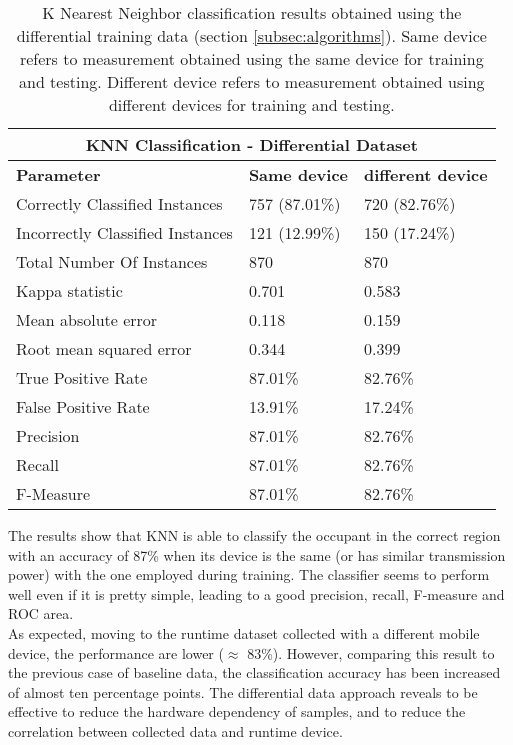 \begin{table}
\center
\caption[K Nearest Neighbor classification results obtained using the differential training data.]{K Nearest Neighbor classification results obtained using the differential training data (section \ref{subsec:algorithms}). Same device refers to measurement obtained using the same device for training and testing. Different device refers to measurement obtained using different devices for training and testing.}
\label{tab:knn-diff}
\begin{tabular}{ |l|l|l| }
  \hline
  \multicolumn{3}{|c|}{\textbf{KNN Classification - Differential Dataset}} \\
  \hline
  \textbf{Parameter} & \textbf{Same device} & \textbf{different device}\\
  \hline
  Correctly Classified Instances & 757 (87.01\%) & 720 (82.76\%) \\
  Incorrectly Classified Instances & 121 (12.99\%) & 150 (17.24\%) \\
  Total Number Of Instances & 870 & 870 \\
  Kappa statistic & 0.701 & 0.583 \\
  Mean absolute error & 0.118 & 0.159 \\
  Root mean squared error & 0.344 & 0.399 \\
  True Positive Rate & 87.01\% & 82.76\% \\
  False Positive Rate & 13.91\% & 17.24\% \\
  Precision & 87.01\% & 82.76\% \\
  Recall & 87.01\% & 82.76\% \\
  F-Measure & 87.01\% & 82.76\% \\
  \hline
\end{tabular}
\end{table}

The results show that KNN is able to classify the occupant in the correct region with an accuracy of 87\% when its device is the same (or has similar transmission power) with the one employed during training.
The classifier seems to perform well even if it is pretty simple, leading to a good precision, recall, F-measure and ROC area.\\
As expected, moving to the runtime dataset collected with a different mobile device, the performance are lower ($\approx$ 83\%). However, comparing this result to the previous case of baseline data, the classification accuracy has been increased of almost ten percentage points. The differential data approach reveals to be effective to reduce the hardware dependency of samples, and to reduce the correlation between collected data and runtime device.



